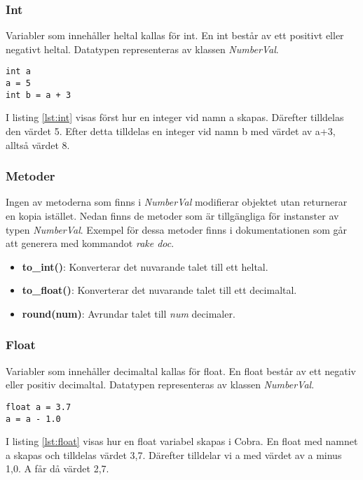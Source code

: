 \documentclass{TDP003mall}
\begin{document}
\subsubsection{Int}
Variabler som innehåller heltal kallas för int. En int består av ett positivt eller negativt heltal. 
Datatypen representeras av klassen \emph{NumberVal}.

\begin{lstlisting}[caption=Int-exempel, label=lst:int]
int a
a = 5
int b = a + 3
\end{lstlisting}
I listing \ref{lst:int} visas först hur en integer vid namn a skapas. Därefter tilldelas den värdet 5. Efter detta tilldelas en integer vid namn b med värdet av a+3, alltså värdet 8.

\subsubsection*{Metoder}
Ingen av metoderna som finns i \emph{NumberVal} modifierar objektet utan returnerar en kopia istället.
Nedan finns de metoder som är tillgängliga för instanster av typen \emph{NumberVal}.
Exempel för dessa metoder finns i dokumentationen som går att generera med kommandot \emph{rake doc}.

\begin{itemize}
    \item \textbf{to\_int()}: Konverterar det nuvarande talet till ett heltal.
    \item \textbf{to\_float()}: Konverterar det nuvarande talet till ett decimaltal.
    \item \textbf{round(num)}: Avrundar talet till \emph{num} decimaler.
\end{itemize}

\subsubsection{Float}
Variabler som innehåller decimaltal kallas för float. En float består av ett negativ eller positiv decimaltal.
Datatypen representeras av klassen \emph{NumberVal}.

\begin{lstlisting}[caption=Float-exempel, label=lst:float]
float a = 3.7
a = a - 1.0
\end{lstlisting}
I listing \ref{lst:float} visas hur en float variabel skapas i Cobra. En float med namnet a skapas och tilldelas värdet 3,7. Därefter tilldelar vi a med värdet av a minus 1,0. A får då värdet 2,7.
\end{document}
